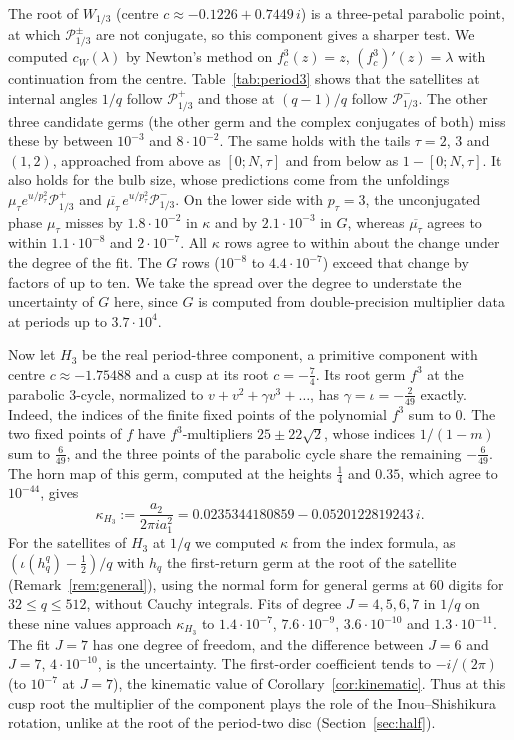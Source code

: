 \documentclass[11pt]{amsart}
\theoremstyle{definition}
\theoremstyle{remark}
\begin{document}
The root of $W_{1/3}$ (centre $c\approx-0.1226+0.7449\,i$) is a three-petal parabolic point, at which $\mathcal P^\pm_{1/3}$ are not conjugate, so this component gives a sharper test. We computed $c_W(\lambda)$ by Newton's method on $f_c^3(z)=z$, $(f_c^3)'(z)=\lambda$ with continuation from the centre. Table~\ref{tab:period3} shows that the satellites at internal angles $1/q$ follow $\mathcal P^+_{1/3}$ and those at $(q-1)/q$ follow $\mathcal P^-_{1/3}$. The other three candidate germs (the other germ and the complex conjugates of both) miss these by between $10^{-3}$ and $8\cdot10^{-2}$. The same holds with the tails $\tau=2$, $3$ and $(1,2)$, approached from above as $[0;N,\tau]$ and from below as $1-[0;N,\tau]$. It also holds for the bulb size, whose predictions come from the unfoldings $\mu_\tau e^{u/p_\tau^2}\mathcal P^+_{1/3}$ and $\overline{\mu_\tau}\,e^{u/p_\tau^2}\mathcal P^-_{1/3}$. On the lower side with $p_\tau=3$, the unconjugated phase $\mu_\tau$ misses by $1.8\cdot10^{-2}$ in $\kappa$ and by $2.1\cdot10^{-3}$ in $G$, whereas $\overline{\mu_\tau}$ agrees to within $1.1\cdot10^{-8}$ and $2\cdot10^{-7}$. All $\kappa$ rows agree to within about the change under the degree of the fit. The $G$ rows ($10^{-8}$ to $4.4\cdot10^{-7}$) exceed that change by factors of up to ten. We take the spread over the degree to understate the uncertainty of $G$ here, since $G$ is computed from double-precision multiplier data at periods up to $3.7\cdot10^4$.

Now let $H_3$ be the real period-three component, a primitive component with centre $c\approx-1.75488$ and a cusp at its root $c=-\frac74$. Its root germ $f^3$ at the parabolic $3$-cycle, normalized to $v+v^2+\gamma v^3+\dots$, has $\gamma=\iota=-\frac2{49}$ exactly. Indeed, the indices of the finite fixed points of the polynomial $f^3$ sum to $0$. The two fixed points of $f$ have $f^3$-multipliers $25\pm22\sqrt2$, whose indices $1/(1-m)$ sum to $\frac6{49}$, and the three points of the parabolic cycle share the remaining $-\frac6{49}$. The horn map of this germ, computed at the heights $\frac14$ and $0.35$, which agree to $10^{-44}$, gives
\[
\kappa_{H_3}:=\frac{a_2}{2\pi ia_1^2}=0.0235344180859-0.0520122819243\,i .
\]
For the satellites of $H_3$ at $1/q$ we computed $\kappa$ from the index formula, as $(\iota(h_q^q)-\frac12)/q$ with $h_q$ the first-return germ at the root of the satellite (Remark~\ref{rem:general}), using the normal form for general germs at $60$ digits for $32\le q\le512$, without Cauchy integrals. Fits of degree $J=4,5,6,7$ in $1/q$ on these nine values approach $\kappa_{H_3}$ to $1.4\cdot10^{-7}$, $7.6\cdot10^{-9}$, $3.6\cdot10^{-10}$ and $1.3\cdot10^{-11}$. The fit $J=7$ has one degree of freedom, and the difference between $J=6$ and $J=7$, $4\cdot10^{-10}$, is the uncertainty. The first-order coefficient tends to $-i/(2\pi)$ (to $10^{-7}$ at $J=7$), the kinematic value of Corollary~\ref{cor:kinematic}. Thus at this cusp root the multiplier of the component plays the role of the Inou--Shishikura rotation, unlike at the root of the period-two disc (Section~\ref{sec:half}).
\end{document}
